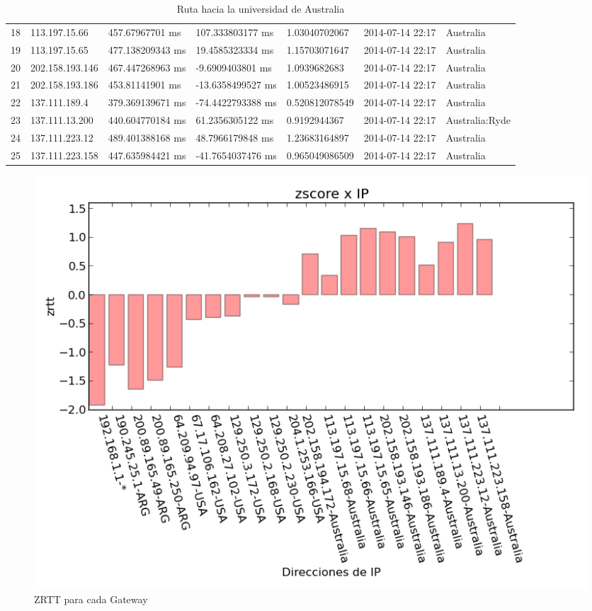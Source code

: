 \begin{table}[H]
{\begin{tabular}{lllllll}
18  & 113.197.15.66   & 457.67967701 ms  & 107.333803177 ms  & 1.03040702067    & 2014-07-14 22:17 & Australia               \\
19  & 113.197.15.65   & 477.138209343 ms & 19.4585323334 ms  & 1.15703071647    & 2014-07-14 22:17 & Australia               \\
20  & 202.158.193.146 & 467.447268963 ms & -9.6909403801 ms  & 1.0939682683     & 2014-07-14 22:17 & Australia               \\
21  & 202.158.193.186 & 453.81141901 ms  & -13.6358499527 ms & 1.00523486915    & 2014-07-14 22:17 & Australia               \\
22  & 137.111.189.4   & 379.369139671 ms & -74.4422793388 ms & 0.520812078549   & 2014-07-14 22:17 & Australia               \\
23  & 137.111.13.200  & 440.604770184 ms & 61.2356305122 ms  & 0.9192944367     & 2014-07-14 22:17 & Australia:Ryde          \\
24  & 137.111.223.12  & 489.401388168 ms & 48.7966179848 ms  & 1.23683164897    & 2014-07-14 22:17 & Australia               \\
25  & 137.111.223.158 & 447.635984421 ms & -41.7654037476 ms & 0.965049086509   & 2014-07-14 22:17 & Australia              
\end{tabular}
}
\caption{Ruta hacia la universidad de Australia}
\label{my-label}
\end{table}


\begin{figure}[H]
	\begin{center}
		  \includegraphics[scale=0.5]{../graficos_informe/mq_zscore.png}
		  \caption{ZRTT para cada Gateway}
		  \label{fig:contra1}
	\end{center}
\end{figure}

